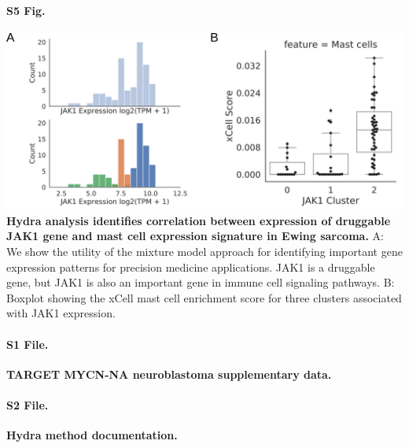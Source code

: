 \documentclass[10pt,letterpaper]{article}
\begin{document}
\paragraph*{S5 Fig.}
\includegraphics[width=\textwidth]{img/PNG/ewing-jak1-expression-fig}
\label{S5_Fig} {\bf Hydra analysis identifies correlation between expression of druggable JAK1 gene and mast cell expression signature in Ewing sarcoma.} A: We show the utility of the mixture model approach for identifying important gene expression patterns for precision medicine applications. JAK1 is a druggable gene, but JAK1 is also an important gene in immune cell signaling pathways. B: Boxplot showing the xCell mast cell enrichment score for three clusters associated with JAK1 expression.

\paragraph*{S1 File.}
\label{S1_File}
{\bf TARGET MYCN-NA neuroblastoma supplementary data.}

\paragraph*{S2 File.}
\label{S2_File}
{\bf Hydra method documentation.}


\end{document}
